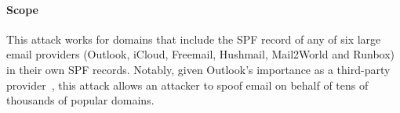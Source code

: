 \paragraph{Scope}
This attack works for domains that include the SPF record of any of six
large email providers (Outlook, iCloud, Freemail, Hushmail, Mail2World and Runbox) in their own SPF records.  Notably, given
Outlook's importance as a third-party provider~\cite{liu2021s}, this
attack allows an attacker to spoof email on behalf of tens of
thousands of popular domains.

